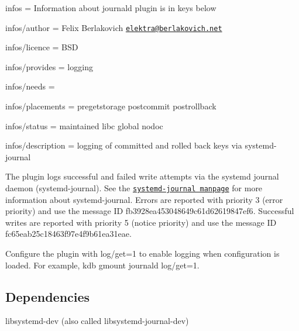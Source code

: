 
\begin{DoxyItemize}
\item infos = Information about journald plugin is in keys below
\item infos/author = Felix Berlakovich \href{mailto:elektra@berlakovich.net}{\tt elektra@berlakovich.\+net}
\item infos/licence = B\+SD
\item infos/provides = logging
\item infos/needs =
\item infos/placements = pregetstorage postcommit postrollback
\item infos/status = maintained libc global nodoc
\item infos/description = logging of committed and rolled back keys via systemd-\/journal
\end{DoxyItemize}

The plugin logs successful and failed write attempts via the systemd journal daemon (systemd-\/journal). See the \href{http://www.freedesktop.org/software/systemd/man/systemd-journald.service.html}{\tt systemd-\/journal manpage} for more information about systemd-\/journal. Errors are reported with priority 3 (error priority) and use the message ID {\ttfamily fb3928ea453048649c61d62619847ef6}. Successful writes are reported with priority 5 (notice priority) and use the message ID {\ttfamily fc65eab25c18463f97e4f9b61ea31eae}.

Configure the plugin with {\ttfamily log/get=1} to enable logging when configuration is loaded. For example, {\ttfamily kdb gmount journald log/get=1}.

\subsection*{Dependencies}


\begin{DoxyItemize}
\item {\ttfamily libsystemd-\/dev} (also called {\ttfamily libsystemd-\/journal-\/dev}) 
\end{DoxyItemize}